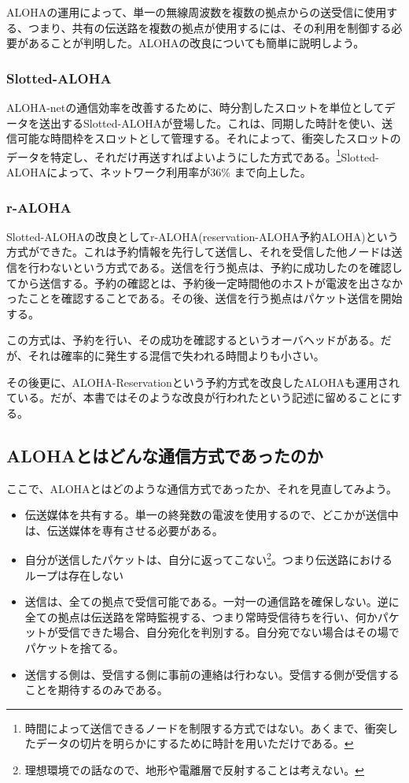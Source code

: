 ALOHAの運用によって、単一の無線周波数を複数の拠点からの送受信に使用する、つまり、共有の伝送路を複数の拠点が使用するには、その利用を制御する必要があることが判明した。ALOHAの改良についても簡単に説明しよう。

\subsubsection{Slotted-ALOHA}

ALOHA-netの通信効率を改善するために、時分割したスロットを単位としてデータを送出するSlotted-ALOHAが登場した。これは、同期した時計を使い、送信可能な時間枠をスロットとして管理する。それによって、衝突したスロットのデータを特定し、それだけ再送すればよいようにした方式である。\footnote{時間によって送信できるノードを制限する方式ではない。あくまで、衝突したデータの切片を明らかにするために時計を用いただけである。}Slotted-ALOHAによって、ネットワーク利用率が36\% まで向上した。

\subsubsection{r-ALOHA}

Slotted-ALOHAの改良としてr-ALOHA(reservation-ALOHA予約ALOHA)という方式ができた。これは予約情報を先行して送信し、それを受信した他ノードは送信を行わないという方式である。送信を行う拠点は、予約に成功したのを確認してから送信する。予約の確認とは、予約後一定時間他のホストが電波を出さなかったことを確認することである。その後、送信を行う拠点はパケット送信を開始する。

この方式は、予約を行い、その成功を確認するというオーバヘッドがある。だが、それは確率的に発生する混信で失われる時間よりも小さい。

その後更に、ALOHA-Reservationという予約方式を改良したALOHAも運用されている。だが、本書ではそのような改良が行われたという記述に留めることにする。

\subsection{ALOHAとはどんな通信方式であったのか}

ここで、ALOHAとはどのような通信方式であったか、それを見直してみよう。

\begin{itemize}
\item 伝送媒体を共有する。単一の終発数の電波を使用するので、どこかが送信中は、伝送媒体を専有させる必要がある。
\item 自分が送信したパケットは、自分に返ってこない\footnote{理想環境での話なので、地形や電離層で反射することは考えない。}。つまり伝送路におけるループは存在しない
\item 送信は、全ての拠点で受信可能である。一対一の通信路を確保しない。逆に全ての拠点は伝送路を常時監視する、つまり常時受信待ちを行い、何かパケットが受信できた場合、自分宛化を判別する。自分宛でない場合はその場でパケットを捨てる。
\item 送信する側は、受信する側に事前の連絡は行わない。受信する側が受信することを期待するのみである。
\end{itemize}

